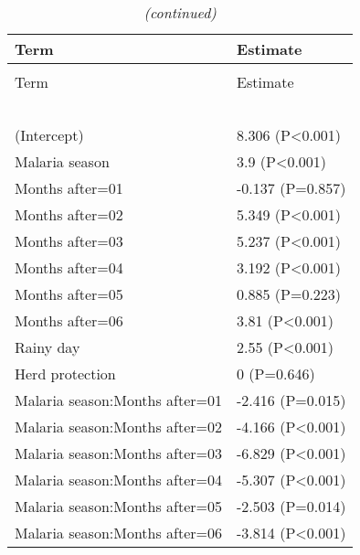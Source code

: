 \documentclass[]{article}
\begin{document}
\begin{longtable}[t]{ll}
\caption{\label{tab:unnamed-chunk-91}}\\
\toprule
Term & Estimate\\
\midrule
\endfirsthead
\caption[]{ \textit{(continued)}}\\
\toprule
Term & Estimate\\
\midrule
\endhead
\
\endfoot
\bottomrule
\endlastfoot
\addlinespace[1.5em]
\multicolumn{2}{l}{\textbf{Permanent field worker}}\\
\hspace{1em}(Intercept) & 8.306 (P<0.001)\\
\hspace{1em}Malaria season & 3.9 (P<0.001)\\
\hspace{1em}Months after=01 & -0.137 (P=0.857)\\
\hspace{1em}Months after=02 & 5.349 (P<0.001)\\
\hspace{1em}Months after=03 & 5.237 (P<0.001)\\
\hspace{1em}Months after=04 & 3.192 (P<0.001)\\
\hspace{1em}Months after=05 & 0.885 (P=0.223)\\
\hspace{1em}Months after=06 & 3.81 (P<0.001)\\
\hspace{1em}Rainy day & 2.55 (P<0.001)\\
\hspace{1em}Herd protection & 0 (P=0.646)\\
\hspace{1em}Malaria season:Months after=01 & -2.416 (P=0.015)\\
\hspace{1em}Malaria season:Months after=02 & -4.166 (P<0.001)\\
\hspace{1em}Malaria season:Months after=03 & -6.829 (P<0.001)\\
\hspace{1em}Malaria season:Months after=04 & -5.307 (P<0.001)\\
\hspace{1em}Malaria season:Months after=05 & -2.503 (P=0.014)\\
\hspace{1em}Malaria season:Months after=06 & -3.814 (P<0.001)\\

\end{longtable}
\end{document}
